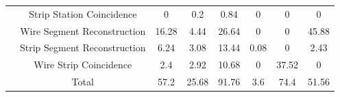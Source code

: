 \begin{table}[]
\begin{tabular}{|c|c|c|c|c|c|c|c|}
                                                                                & Strip Station Coincidence    & 0                                                         & 0.2                                                       & 0.84                                                     & 0                                                                 & 0                                                      & 0                                                      \\ \cline{2-8} 
                                                                                & Wire Segment Reconstruction  & 16.28                                                     & 4.44                                                      & 26.64                                                    & 0                                                                 & 0                                                      & 45.88                                                  \\ \cline{2-8} 
                                                                                & Strip Segment Reconstruction & 6.24                                                      & 3.08                                                      & 13.44                                                    & 0.08                                                              & 0                                                      & 2.43                                                   \\ \cline{2-8} 
                                                                                & Wire Strip Coincidence       & 2.4                                                       & 2.92                                                      & 10.68                                                    & 0                                                                 & 37.52                                                  & 0                                                      \\ \cline{2-8} 
                                                                                & Total                        & 57.2                                                      & 25.68                                                     & 91.76                                                    & 3.6                                                               & 74.4                                                   & 51.56                                                  \\ \hline\hline

\end{tabular}
\end{table}
